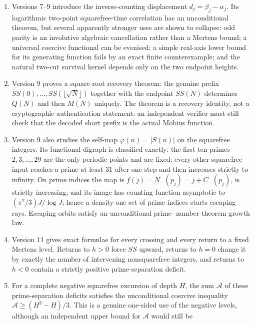 \documentclass[11pt]{amsart}
\numberwithin{equation}{section}
\theoremstyle{plain}
\theoremstyle{definition}
\theoremstyle{remark}
\begin{document}
\begin{enumerate}[label=(\roman*)]
the sign or zeta phase of $M$. No such coupling is detected at the present
scale. With effective sample about $1.7\times10^4$, the tests only exclude
linear effects larger than roughly $0.015$ and do not constitute a theorem of
independence.
\item Versions 7--9 introduce the inverse-counting displacement
$d_j=\beta_j-\alpha_j$.  Its logarithmic two-point squarefree-time correlation
has an unconditional theorem, but several apparently stronger uses are shown
to collapse: odd parity is an involutive algebraic cancellation rather than a
Mertens bound; a universal coercive functional can be evenised; a simple
real-axis lower bound for its generating function fails by an exact finite
counterexample; and the natural two-cut survival kernel depends only on the
two endpoint heights.
\item Version 9 proves a square-root recovery theorem: the genuine prefix
$SS(0),\ldots,SS(\lfloor\sqrt N\rfloor)$ together with the endpoint $SS(N)$
determines $Q(N)$ and then $M(N)$ uniquely.  The theorem is a recovery identity,
not a cryptographic authentication statement: an independent verifier must still
check that the decoded short prefix is the actual M\"obius function.
\item Version 9 also studies the self-map $\varphi(n)=|S(n)|$ on the squarefree
integers.  Its functional digraph is classified exactly: the first ten primes
$2,3,\ldots,29$ are the only periodic points and are fixed; every other
squarefree input reaches a prime at least $31$ after one step and then increases
strictly to infinity.  On prime indices the map is
$f(j)=N_-(p_j)=j+C_-(p_j)$, is strictly increasing, and its image has counting
function asymptotic to $(\pi^2/3)J/\log J$; hence a density-one set of prime
indices starts escaping rays.  Escaping orbits satisfy an unconditional prime-
number-theorem growth law.
\item Version 11 gives exact formulae for every crossing and every return to a
fixed Mertens level.  Returns to $h>0$ force $SS$ upward, returns to $h=0$
change it by exactly the number of intervening nonsquarefree integers, and
returns to $h<0$ contain a strictly positive prime-separation deficit.
\item For a complete negative squarefree excursion of depth $H$, the sum
$\mathcal A$ of these prime-separation deficits satisfies the unconditional
coercive inequality
$\mathcal A\ge (H^3-H)/3$.  This is a genuine one-sided use of the negative
levels, although an independent upper bound for $\mathcal A$ would still be

\end{enumerate}
\end{document}

